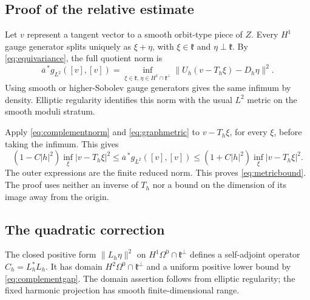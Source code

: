 \documentclass[11pt]{amsart}
\theoremstyle{definition}
\theoremstyle{remark}
\newcommand{\kk}{\mathfrak k}
\newcommand{\norm}[1]{\lVert #1\rVert}
\begin{document}
\subsection{Proof of the relative estimate}
Let $v$ represent a tangent vector to a smooth orbit-type piece of
$Z$. Every $H^1$ gauge generator splits uniquely as $\xi+\eta$,
with $\xi\in\kk$ and $\eta\perp\kk$. By
\eqref{eq:equivariance}, the full quotient norm is
\begin{equation}\label{eq:fullquotient}
 \overline a^{\,*}g_{L^2}([v],[v])
 =\inf_{\xi\in\kk,\,\eta\in H^1\cap\kk^\perp}
    \norm{U_h(v-T_h\xi)-D_h\eta}^2.
\end{equation}
Using smooth or higher-Sobolev gauge generators gives the same infimum
by density. Elliptic regularity identifies this norm with the usual
$L^2$ metric on the smooth moduli stratum.

Apply \eqref{eq:complementnorm} and \eqref{eq:graphmetric} to
$v-T_h\xi$, for every $\xi$, before taking the infimum. This gives
\[
 (1-C|h|^2)\inf_\xi|v-T_h\xi|^2
 \leq\overline a^{\,*}g_{L^2}([v],[v])
 \leq(1+C|h|^2)\inf_\xi|v-T_h\xi|^2.
\]
The outer expressions are the finite reduced norm. This proves
\eqref{eq:metricbound}. The proof uses neither an inverse of $T_h$
nor a bound on the dimension of its image away from the origin.

\subsection{The quadratic correction}
The closed positive form $\norm{L_h\eta}^2$ on
$H^1\Omega^0\cap\kk^\perp$ defines a self-adjoint operator
$C_h=L_h^*L_h$. It has domain $H^2\Omega^0\cap\kk^\perp$ and
a uniform positive lower bound by \eqref{eq:complementgap}.
The domain assertion follows from elliptic regularity; the fixed
harmonic projection has smooth finite-dimensional range.
\end{document}
